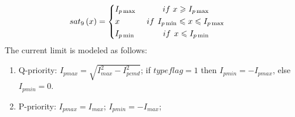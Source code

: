 \documentclass[journal]{IEEEtran}
\begin{document}
	\begin{equation}\label{sat9}
	sa{t_9}\left( x \right) = \left\{ \begin{aligned}
	&{I_{p\max }} {\kern 1pt} {\kern 1pt} {\kern 1pt} {\kern 1pt} {\kern 1pt} {\kern 1pt} {\kern 1pt} {\kern 1pt} {\kern 1pt} {\kern 1pt} {\kern 1pt} {\kern 1pt} {\kern 1pt} {\kern 1pt} {\kern 1pt} {\kern 1pt} {\kern 1pt} {\kern 1pt} {\kern 1pt} {\kern 1pt} {\kern 1pt} {\kern 1pt} {\kern 1pt} {\kern 1pt} {\kern 1pt} {\kern 1pt} {\kern 1pt} {\kern 1pt} {\kern 1pt} {\kern 1pt} {\kern 1pt} {\kern 1pt} {\kern 1pt} if{\kern 1pt} {\kern 1pt} {\kern 1pt} x \geqslant {I_{p\max }}\\ 
	&x{\kern 1pt} {\kern 1pt} {\kern 1pt} {\kern 1pt} {\kern 1pt} {\kern 1pt} {\kern 1pt} {\kern 1pt} {\kern 1pt} {\kern 1pt} {\kern 1pt} {\kern 1pt} {\kern 1pt} {\kern 1pt} {\kern 1pt} {\kern 1pt} {\kern 1pt} {\kern 1pt} {\kern 1pt} {\kern 1pt} {\kern 1pt} {\kern 1pt} {\kern 1pt} {\kern 1pt} {\kern 1pt} {\kern 1pt} {\kern 1pt} {\kern 1pt} {\kern 1pt} {\kern 1pt} {\kern 1pt} {\kern 1pt} {\kern 1pt} if{\kern 1pt} {\kern 1pt} {\kern 1pt} {\kern 1pt} {I_{p\min }} \leqslant x \leqslant {I_{p\max }}\\ 
	&{I_{p\min }}{\kern 1pt} {\kern 1pt} {\kern 1pt} {\kern 1pt} {\kern 1pt} {\kern 1pt} {\kern 1pt} {\kern 1pt} {\kern 1pt} {\kern 1pt} {\kern 1pt} {\kern 1pt} {\kern 1pt} {\kern 1pt} {\kern 1pt} {\kern 1pt} {\kern 1pt} {\kern 1pt} {\kern 1pt} {\kern 1pt} {\kern 1pt} {\kern 1pt} {\kern 1pt} {\kern 1pt} {\kern 1pt} {\kern 1pt} {\kern 1pt} {\kern 1pt} {\kern 1pt} {\kern 1pt} {\kern 1pt} {\kern 1pt} {\kern 1pt} {\kern 1pt} {\kern 1pt} if{\kern 1pt} {\kern 1pt} {\kern 1pt} {\kern 1pt} x \leqslant {I_{p\min }}
	\end{aligned} \right.{\kern 1pt} {\kern 1pt} {\kern 1pt} {\kern 1pt} {\kern 1pt} {\kern 1pt} {\kern 1pt} {\kern 1pt} {\kern 1pt} {\kern 1pt}
	\end{equation}
	The current limit is modeled as follows:
	\begin{enumerate}
		\item Q-priority: $I_{pmax}=\sqrt{I_{max}^2-I_{pcmd}^2}$; if $typeflag=1$ then $I_{pmin}=-I_{pmax}$, else $I_{pmin}=0$.
		\item P-priority: $I_{pmax}=I_{max}$; $I_{pmin}=-I_{max}$;
	\end{enumerate}
	\renewcommand\arraystretch{1.5}
\end{document}
